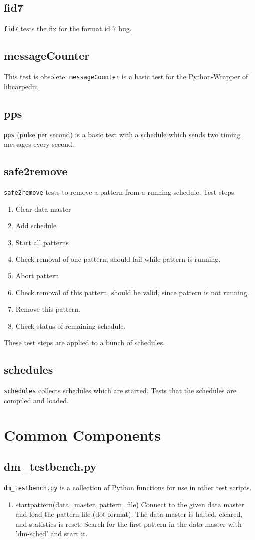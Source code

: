 \documentclass[12pt,a4paper]{report}
\begin{document}
\section{fid7}
\texttt{fid7} tests the fix for the format id 7 bug.

\section{messageCounter} This test is obsolete.
\texttt{messageCounter} is a basic test for the Python-Wrapper of libcarpedm.
\section{pps}
\texttt{pps} (pulse per second) is a basic test with a schedule which sends two timing messages every second.
\section{safe2remove}
\texttt{safe2remove} tests to remove a pattern from a running schedule. Test steps:
\begin{enumerate}
\item Clear data master
\item Add schedule
\item Start all patterns
\item Check removal of one pattern, should fail while pattern is running.
\item Abort pattern
\item Check removal of this pattern, should be valid, since pattern is not running.
\item Remove this pattern.
\item Check status of remaining schedule.
\end{enumerate}
These test steps are applied to a bunch of schedules.

\section{schedules}
\texttt{schedules} collects schedules which are started. Tests that the schedules are compiled and loaded.
\chapter{Common Components}
\section{dm\_testbench.py}
\texttt{dm\_testbench.py} is a collection of Python functions for use in other test scripts.
\begin{enumerate}
\item startpattern(data\_master, pattern\_file)
    Connect to the given data master and load the pattern file (dot format).
    The data master is halted, cleared, and statistics is reset.
    Search for the first pattern in the data master with 'dm-sched' and start it.
\end{enumerate}
\end{document}
